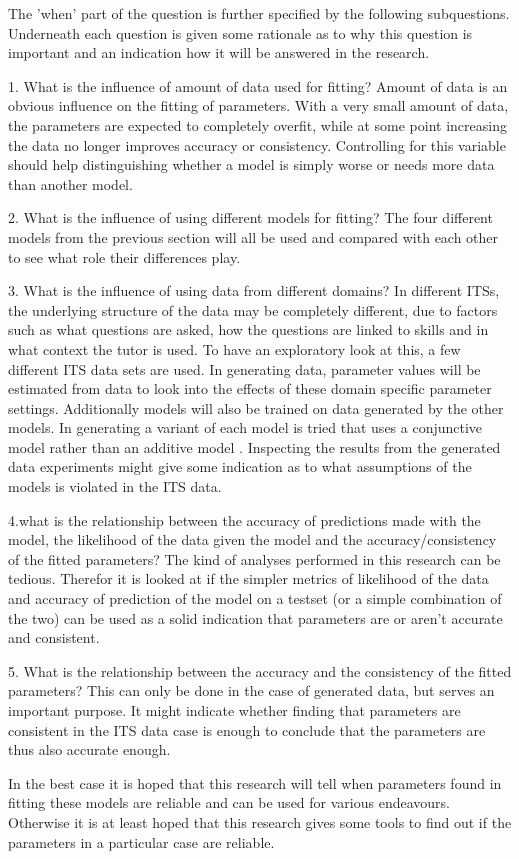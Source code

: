 \documentclass{scrartcl}
\begin{document}
The 'when' part of the question is further specified by the following subquestions. Underneath each question is given some rationale as to why this question is important and an indication how it will be answered in the research.

1. What is the influence of amount of data used for fitting? Amount of data is an obvious influence on the fitting of parameters. With a very small amount of data, the parameters are expected to completely overfit, while at some point increasing the data no longer improves accuracy or consistency. Controlling for this variable should help distinguishing whether a model is simply worse or needs more data than another model.

2. What is the influence of using different models for fitting? The four different models from the previous section will all be used and compared with each other to see what role their differences play.

3. What is the influence of using data from different domains? In different ITSs, the underlying structure of the data may be completely different, due to factors such as what questions are asked, how the questions are linked to skills and in what context the tutor is used. To have an exploratory look at this, a few different ITS data sets are used. In generating data, parameter values will be estimated from data to look into the effects of these domain specific parameter settings. Additionally models will also be trained on data generated by the other models. In generating a variant of each model is tried that uses a conjunctive model rather than an additive model \cite{skillcombi}. Inspecting the results from the generated data experiments might give some indication as to what assumptions of the models is violated in the ITS data.

4.what is the relationship between the accuracy of predictions made with the model, the likelihood of the data given the model and the accuracy/consistency of the fitted parameters? The kind of analyses performed in this research can be tedious. Therefor it is looked at if the simpler metrics of likelihood of the data and accuracy of prediction of the model on a testset (or a simple combination of the two) can be used as a solid indication that parameters are or aren't accurate and consistent.

5. What is the relationship between the accuracy and the consistency of the fitted parameters? This can only be done in the case of generated data, but serves an important purpose. It might indicate whether finding that parameters are consistent in the ITS data case is enough to conclude that the parameters are thus also accurate enough.

In the best case it is hoped that this research will tell when parameters found in fitting these models are reliable and can be used for various endeavours. Otherwise it is at least hoped that this research gives some tools to find out if the parameters in a particular case are reliable.


\end{document}
